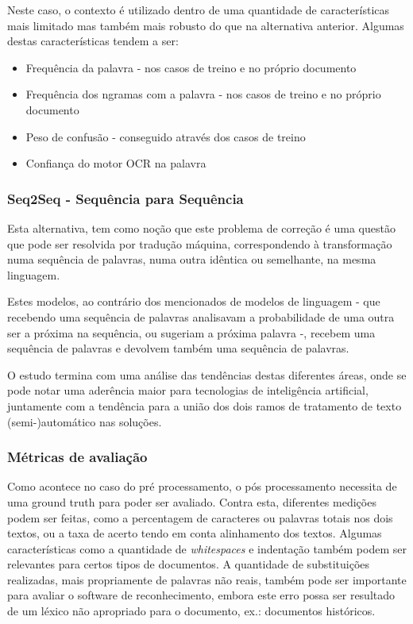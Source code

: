 Neste caso, o contexto é utilizado dentro de uma quantidade de características mais limitado mas também mais robusto do que na alternativa anterior. Algumas destas características tendem a ser:
\begin{itemize}
    \item Frequência da palavra - nos casos de treino e no próprio documento
    \item Frequência dos ngramas com a palavra -  nos casos de treino e no próprio documento
    \item Peso de confusão - conseguido através dos casos de treino
    \item Confiança do motor OCR na palavra
\end{itemize}

\subsubsection{Seq2Seq - Sequência para Sequência}

Esta alternativa, tem como noção que este problema de correção é uma questão que pode ser resolvida por tradução máquina, correspondendo à transformação numa sequência de palavras, numa outra idêntica ou semelhante, na mesma linguagem.

Estes modelos, ao contrário dos mencionados de modelos de linguagem - que recebendo uma sequência de palavras analisavam a probabilidade de uma outra ser a próxima na sequência, ou sugeriam a próxima palavra -, recebem uma sequência de palavras e devolvem também uma sequência de palavras.

\hspace{10pt}

O estudo termina com uma análise das tendências destas diferentes áreas, onde se pode notar uma aderência maior para tecnologias de inteligência artificial, juntamente com a tendência para a união dos dois ramos de tratamento de texto (semi-)automático nas soluções.


\subsubsection{Métricas de avaliação}
Como acontece no caso do pré processamento, o pós processamento necessita de uma \gls{ground truth} para poder ser avaliado. Contra esta, diferentes medições podem ser feitas, como a percentagem de caracteres ou palavras totais nos dois textos, ou a taxa de acerto tendo em conta alinhamento dos textos. Algumas características como a quantidade de \textit{whitespaces} e indentação também podem ser relevantes para certos tipos de documentos. A quantidade de substituições realizadas, mais propriamente de palavras não reais, também pode ser importante para avaliar o software de reconhecimento, embora este erro possa ser resultado de um léxico não apropriado para o documento, ex.: documentos históricos. 

